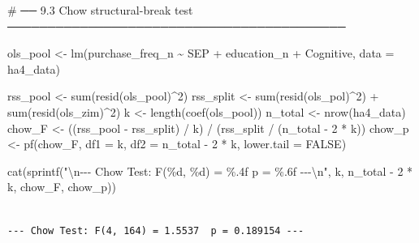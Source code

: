 \documentclass[
  letterpaper,
  DIV=11,
  numbers=noendperiod]{scrartcl}
\newenvironment{Shaded}{\begin{snugshade}}{\end{snugshade}}
\newcommand{\AttributeTok}[1]{\textcolor[rgb]{0.40,0.45,0.13}{#1}}
\newcommand{\CommentTok}[1]{\textcolor[rgb]{0.37,0.37,0.37}{#1}}
\newcommand{\ConstantTok}[1]{\textcolor[rgb]{0.56,0.35,0.01}{#1}}
\newcommand{\DecValTok}[1]{\textcolor[rgb]{0.68,0.00,0.00}{#1}}
\newcommand{\FunctionTok}[1]{\textcolor[rgb]{0.28,0.35,0.67}{#1}}
\newcommand{\NormalTok}[1]{\textcolor[rgb]{0.00,0.23,0.31}{#1}}
\newcommand{\OtherTok}[1]{\textcolor[rgb]{0.00,0.23,0.31}{#1}}
\newcommand{\SpecialCharTok}[1]{\textcolor[rgb]{0.37,0.37,0.37}{#1}}
\newcommand{\StringTok}[1]{\textcolor[rgb]{0.13,0.47,0.30}{#1}}
\begin{document}
\begin{Shaded}
\begin{Highlighting}[]
\CommentTok{\# ── 9.3  Chow structural{-}break test ──────────────────────────────────────────}

\NormalTok{ols\_pool }\OtherTok{\textless{}{-}} \FunctionTok{lm}\NormalTok{(purchase\_freq\_n }\SpecialCharTok{\textasciitilde{}}\NormalTok{ SEP }\SpecialCharTok{+}\NormalTok{ education\_n }\SpecialCharTok{+}\NormalTok{ Cognitive, }\AttributeTok{data =}\NormalTok{ ha4\_data)}

\NormalTok{rss\_pool }\OtherTok{\textless{}{-}} \FunctionTok{sum}\NormalTok{(}\FunctionTok{resid}\NormalTok{(ols\_pool)}\SpecialCharTok{\^{}}\DecValTok{2}\NormalTok{)}
\NormalTok{rss\_split }\OtherTok{\textless{}{-}} \FunctionTok{sum}\NormalTok{(}\FunctionTok{resid}\NormalTok{(ols\_pol)}\SpecialCharTok{\^{}}\DecValTok{2}\NormalTok{) }\SpecialCharTok{+} \FunctionTok{sum}\NormalTok{(}\FunctionTok{resid}\NormalTok{(ols\_zim)}\SpecialCharTok{\^{}}\DecValTok{2}\NormalTok{)}
\NormalTok{k  }\OtherTok{\textless{}{-}} \FunctionTok{length}\NormalTok{(}\FunctionTok{coef}\NormalTok{(ols\_pool))}
\NormalTok{n\_total    }\OtherTok{\textless{}{-}} \FunctionTok{nrow}\NormalTok{(ha4\_data)}
\NormalTok{chow\_F     }\OtherTok{\textless{}{-}}\NormalTok{ ((rss\_pool }\SpecialCharTok{{-}}\NormalTok{ rss\_split) }\SpecialCharTok{/}\NormalTok{ k) }\SpecialCharTok{/}\NormalTok{ (rss\_split }\SpecialCharTok{/}\NormalTok{ (n\_total }\SpecialCharTok{{-}} \DecValTok{2} \SpecialCharTok{*}\NormalTok{ k))}
\NormalTok{chow\_p     }\OtherTok{\textless{}{-}} \FunctionTok{pf}\NormalTok{(chow\_F, }\AttributeTok{df1 =}\NormalTok{ k, }\AttributeTok{df2 =}\NormalTok{ n\_total }\SpecialCharTok{{-}} \DecValTok{2} \SpecialCharTok{*}\NormalTok{ k, }\AttributeTok{lower.tail =} \ConstantTok{FALSE}\NormalTok{)}

\FunctionTok{cat}\NormalTok{(}\FunctionTok{sprintf}\NormalTok{(}\StringTok{"}\SpecialCharTok{\textbackslash{}n}\StringTok{{-}{-}{-} Chow Test: F(\%d, \%d) = \%.4f  p = \%.6f {-}{-}{-}}\SpecialCharTok{\textbackslash{}n}\StringTok{"}\NormalTok{,}
\NormalTok{            k, n\_total }\SpecialCharTok{{-}} \DecValTok{2} \SpecialCharTok{*}\NormalTok{ k, chow\_F, chow\_p))}
\end{Highlighting}
\end{Shaded}

\begin{verbatim}

--- Chow Test: F(4, 164) = 1.5537  p = 0.189154 ---
\end{verbatim}
\end{document}
